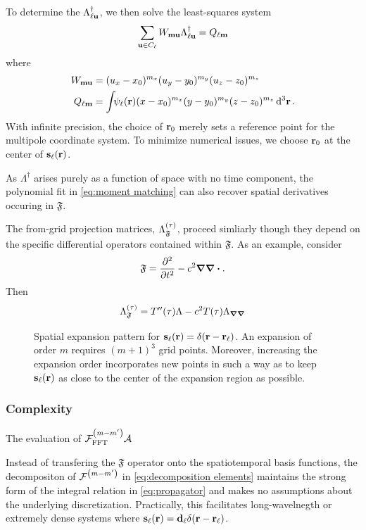 To determine the $\Lambda_{\ell \vb{u}}^\dagger$, we then solve the least-squares system
\begin{equation}
  \sum_{\vb{u} \in C_\ell} W_{\vb{m}\vb{u}}\Lambda_{\ell\vb{u}}^\dagger = Q_{\ell\vb{m}}
  \label{eq:expansion matrix system}
\end{equation}
where
\begin{subequations}
  \begin{align}
    W_{\vb{m}\vb{u}} &= (u_x - x_0)^{m_x} (u_y - y_0)^{m_y} (u_z - z_0)^{m_z} \label{eq:w matrix} \\
    Q_{\ell \vb{m}} &= \int_{} \psi_\ell(\vb{r}) (x - x_0)^{m_x} (y - y_0)^{m_y} (z - z_0)^{m_z} \dd[3]{\vb{r}} \label{eq:q vector}.
  \end{align}
\end{subequations}
With infinite precision, the choice of $\vb{r}_0$ merely sets a reference point for the multipole coordinate system.
To minimize numerical issues, we choose $\vb{r}_0$ at the center of $\vb{s}_\ell(\vb{r})$.

As $\Lambda^\dagger$ arises purely as a function of space with no time component, the polynomial fit in \cref{eq:moment matching} can also recover spatial derivatives occuring in $\mathfrak{F}$.

The from-grid projection matrices, $\Lambda_\mathfrak{F}^\qty(\tau)$, proceed simliarly though they depend on the specific differential operators contained within $\mathfrak{F}$.
As an example, consider
\begin{equation}
  \mathfrak{F} = \pdv[2]{t} - c^2 \grad \grad \boldsymbol{\cdot}.
\end{equation}
Then
\begin{equation}
  \Lambda_\mathfrak{F}^\qty(\tau) = T''(\tau) \Lambda - c^2 T(\tau) \Lambda_{\grad \grad}
\end{equation}

\begin{figure}
  \centering
  \caption{\label{fig:expansion grid}Spatial expansion pattern for $\vb{s}_\ell(\vb{r}) = \delta(\vb{r} - \vb{r}_\ell)$.
    An expansion of order $m$ requires $(m + 1)^3$ grid points.
    Moreover, increasing the expansion order incorporates new points in such a way as to keep $\vb{s}_\ell(\vb{r})$ as close to the center of the expansion region as possible.
  }
\end{figure}

\subsubsection{Complexity}

The evaluation of $\mathcal{F}_\text{FFT}^\qty(m-m') \mathcal{A}$

Instead of transfering the $\mathfrak{F}$ operator onto the spatiotemporal basis functions, the decompositon of $\mathcal{F}^\qty(m-m')$ in \cref{eq:decomposition elements} maintains the strong form of the integral relation in \cref{eq:propagator} and makes no assumptions about the underlying discretization.
Practically, this facilitates long-wavelnegth or extremely dense systems where $\vb{s}_\ell(\vb{r}) = \vb{d}_\ell \delta(\vb{r}-\vb{r}_\ell)$.


